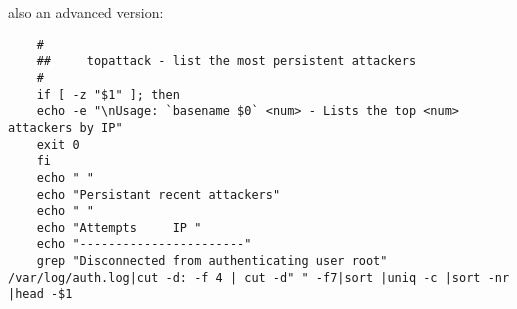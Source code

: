 also an advanced version:
\begin{verbatim}
	#
	##     topattack - list the most persistent attackers
	#
	if [ -z "$1" ]; then
	echo -e "\nUsage: `basename $0` <num> - Lists the top <num> attackers by IP"
	exit 0
	fi
	echo " "
	echo "Persistant recent attackers"
	echo " "
	echo "Attempts     IP "
	echo "-----------------------"
	grep "Disconnected from authenticating user root" /var/log/auth.log|cut -d: -f 4 | cut -d" " -f7|sort |uniq -c |sort -nr |head -$1
\end{verbatim}
